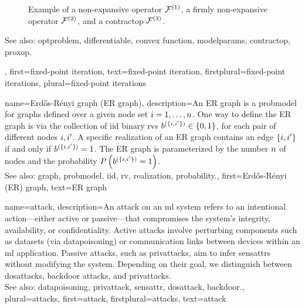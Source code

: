 {{\begin{figure}[H]
\begin{center}
			\end{center} 
			\caption{Example of a non-expansive operator $\mathcal{F}^{(1)}$, a firmly non-expansive operator $\mathcal{F}^{(2)}$, and 
				a \gls{contractop} $\mathcal{F}^{(3)}$. \label{fig_examples_nonexp_dict}}
		\end{figure} 
		See also: \gls{optproblem}, \gls{differentiable}, \gls{convex} \gls{function}, \glspl{modelparam}, \gls{contractop}, \gls{proxop}.},
	first={fixed-point iteration},
	text={fixed-point iteration},
	firstplural={fixed-point iterations}, 
	plural={fixed-point iterations}
}


{name={Erd\H{o}s-R\'enyi graph (ER graph)},
	description={An ER  \gls{graph} is a \gls{probmodel} for \glspl{graph} defined over 
		a given node set $i=1, \ldots, n$. One way to define the ER \gls{graph} is 
		via the collection of \gls{iid} binary \glspl{rv} $b^{(\{i,i'\})} \in \{0,1\}$, 
		for each pair of different nodes $i, i'$. A specific \gls{realization}  
		of an ER \gls{graph} contains an edge $\{i,i'\}$ if and only if 
		$b^{(\{i,i'\})}=1$. The ER \gls{graph} is parameterized by the 
		number $n$ of nodes and the \gls{probability} $P\left(b^{(\{i,i'\})}=1\right)$. 
		\\
		See also: \gls{graph}, \gls{probmodel}, \gls{iid}, \gls{rv}, \gls{realization}, \gls{probability}.},
	first={Erd\H{o}s-R\'enyi (ER) graph},
	text={ER graph}
}

{name={attack},  
	description={An attack on an \gls{ml} system refers to an intentional action—either 
		active or passive—that compromises the system's integrity, availability, or confidentiality. 
		Active attacks involve perturbing components such as \glspl{dataset} (via \gls{datapoisoning}) 
		or communication links between \glspl{device} within an \gls{ml} application. Passive attacks, 
		such as \glspl{privattack}, aim to infer \glspl{sensattr} without modifying the system. 
		Depending on their goal, we distinguish between \glspl{dosattack}, \gls{backdoor} attacks, and \glspl{privattack}.
		\\
		See also: \gls{datapoisoning}, \gls{privattack}, \gls{sensattr}, \gls{dosattack}, \gls{backdoor}.},
	plural={attacks}, 
	first={attack},
	firstplural={attacks},
	text={attack}
}

